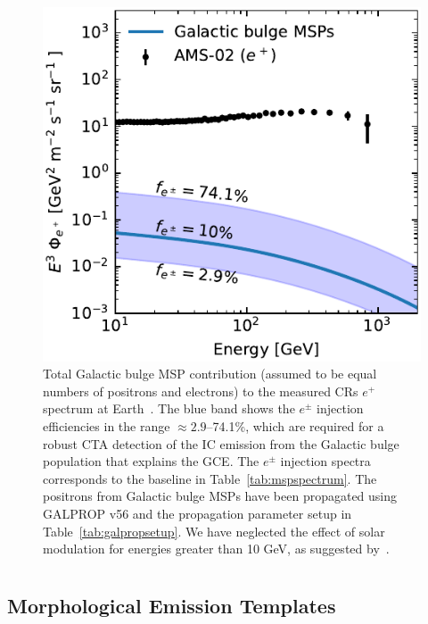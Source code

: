 \documentclass[doublespace,draft,nopageskip]{VTthesis} %
\begin{document}
\begin{appendices}
\begin{figure}
    \begin{center}
    \includegraphics[scale =1]{Figures/CTA/positrons_at_Earth.pdf}
    \caption{Total Galactic bulge MSP contribution (assumed to be equal numbers of positrons and electrons) to the measured CRs $e^+$ spectrum at Earth~\citep{Aguilar:2021tos}. The blue band shows the $e^\pm$ injection efficiencies in the range $\approx 2.9$--74.1\%, which are required for a robust CTA detection of the IC emission from the Galactic bulge population that explains the GCE. The $e^\pm$ injection spectra corresponds to the baseline in Table~\ref{tab:mspspectrum}.  The positrons from Galactic bulge MSPs have been propagated using \textsc{GALPROP} v56 and the propagation parameter setup in Table~\ref{tab:galpropsetup}. We have neglected the effect of solar modulation for energies greater than 10 GeV, as suggested by~\citet{Strauss:2015}.}\label{fig:MSPpositronsatEarth}
    \end{center}
    
  \end{figure}

  \chapter{}\label{app:C}

	\section{Morphological Emission Templates}\label{sec:emission_templates}
	

\end{appendices}
\end{document}
